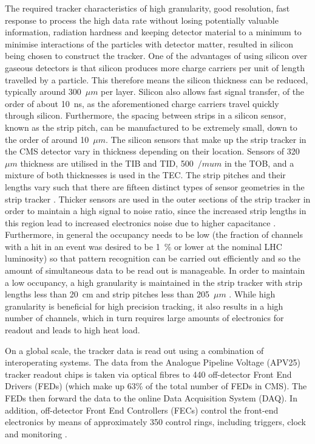 The required tracker characteristics of high granularity, good resolution, fast response to process the high
data rate without losing potentially valuable information, radiation hardness and keeping detector material to
a minimum to minimise interactions of the particles with detector matter, resulted in silicon being chosen to
construct the tracker. One of the advantages of using silicon over gaseous detectors is that silicon produces
more charge carriers per unit of length travelled by a particle. This therefore means the silicon thickness
can be reduced, typically around 300~$\mu m$ per layer. Silicon also allows fast signal transfer, of the order
of about 10~ns, as the aforementioned charge carriers travel quickly through silicon.
Furthermore, the spacing between strips in a silicon sensor, known as the strip pitch, can be manufactured to
be extremely small, down to the order of around 10~$\mu m$.
The silicon sensors that make up the strip tracker in the CMS detector vary in thickness depending on their
location. Sensors of 320~$\mu m$ thickness are utilised in the TIB and TID, 500~$/mu m$ in the TOB, and a
mixture of both thicknesses is used in the TEC. The strip pitches and their lengths vary such that there are
fifteen distinct types of sensor geometries in the strip tracker
\cite{Commissioning_and_Performance_Strip_Tracker}. Thicker sensors are used in the outer sections of the
strip tracker in order to maintain a high signal to noise ratio, since the increased strip lengths in this
region lead to increased electronics noise due to higher capacitance \cite{CMS_experiment}.
Furthermore, in general the occupancy needs to be low (the fraction of channels with a hit in an event was
desired to be 1~\% or lower at the nominal LHC luminosity) so that pattern recognition can be carried out
efficiently and so the amount of simultaneous data to be read out is manageable. In order to maintain a low
occupancy, a high granularity is maintained in the strip tracker with strip lengths less than 20~cm and strip
pitches less than 205~$\mu m$ \cite{Palmonari:1260970}.
While high granularity is beneficial for high precision tracking, it also results in a high number of
channels, which in turn requires large amounts of electronics for readout and leads to high heat load.

On a global scale, the tracker data is read out using a combination of interoperating systems.
The data from the Analogue Pipeline Voltage (APV25) tracker readout chips is taken via optical fibres to 440
off-detector Front End Drivers (FEDs) (which make up 63\% of the total number of FEDs in CMS).
The FEDs then forward the data to the online Data Acquisition System (DAQ). In addition, off-detector Front
End Controllers (FECs) control the front-end electronics by means of approximately 350 control rings,
including triggers, clock and monitoring \cite{CMS_experiment, Corrin}.

